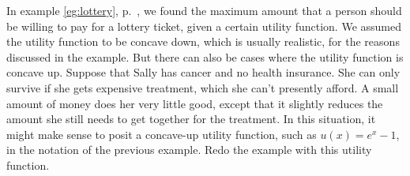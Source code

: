 In example \ref{eg:lottery}, p.~\pageref{eg:lottery}, we found the
maximum amount that a person should be willing to pay for a lottery
ticket, given a certain utility function. We assumed the utility function
to be concave down, which is usually realistic, for the reasons
discussed in the example. But there can also be cases where the utility
function is concave up. Suppose that Sally has cancer and no health insurance.
She can only survive if she gets expensive treatment, which she can't presently
afford. A small amount of money does her very little good, except that it slightly
reduces the amount she still needs to get together for the treatment.
In this situation, it might make sense to posit a concave-up utility function,
such as $u(x)=e^x-1$, in the notation of the previous example.
Redo the example with this utility function.\answercheck
